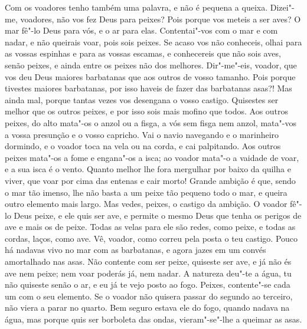 Com os voadores tenho também uma palavra, e não é pequena a queixa.
Dizei"-me, voadores, não vos fez Deus para peixes? Pois porque vos meteis
a ser aves? O mar fê"-lo Deus para vós, e o ar para elas. Contentai"-vos
com o mar e com nadar, e não queirais voar, pois sois peixes. Se acaso
vos não conheceis, olhai para as vossas espinhas e para as vossas
escamas, e conhecereis que não sois aves, senão peixes, e ainda entre os
peixes não dos melhores. Dir"-me"-eis, voador, que vos deu Deus maiores
barbatanas que aos outros de vosso tamanho. Pois porque tivestes maiores
barbatanas, por isso haveis de fazer das barbatanas asas?! Mas ainda
mal, porque tantas vezes vos desengana o vosso castigo. Quisestes ser
melhor que os outros peixes, e por isso sois mais mofino que todos. Aos
outros peixes, do alto mata"-os o anzol ou a fisga, a vós sem fisga nem
anzol, mata"-vos a vossa presunção e o vosso capricho. Vai o navio
navegando e o marinheiro dormindo, e o voador toca na vela ou na corda,
e cai palpitando. Aos outros peixes mata"-os a fome e engana"-os a isca;
ao voador mata"-o a vaidade de voar, e a sua isca é o vento. Quanto
melhor lhe fora mergulhar por baixo da quilha e viver, que voar por cima
das entenas e cair morto!
Grande ambição é que, sendo o mar tão imenso, lhe não basta a um peixe
tão pequeno todo o mar, e queira outro elemento mais largo. Mas vedes,
peixes, o castigo da ambição. O voador fê"-lo Deus peixe, e ele quis ser
ave, e permite o mesmo Deus que tenha os perigos de ave e mais os de
peixe. Todas as velas para ele são redes, como peixe, e todas as cordas,
laços, como ave. Vê, voador, como correu pela posta o teu castigo. Pouco
há nadavas vivo no mar com as barbatanas, e agora jazes em um convés
amortalhado nas asas. Não contente com ser peixe, quiseste ser ave, e já
não és ave nem peixe; nem voar poderás já, nem nadar. A natureza deu"-te
a água, tu não quiseste senão o ar, e eu já te vejo posto ao fogo.
Peixes, contente"-se cada um com o seu elemento. Se o voador não quisera
passar do segundo ao terceiro, não viera a parar no quarto. Bem seguro
estava ele do fogo, quando nadava na água, mas porque quis ser borboleta
das ondas, vieram"-se"-lhe a queimar as asas.

